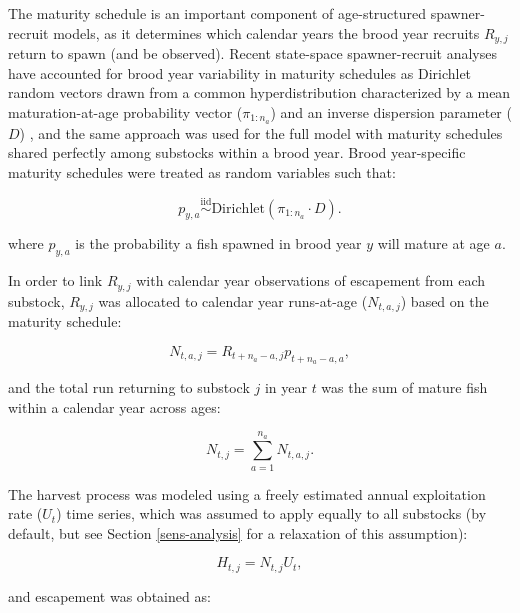 \documentclass[12pt,]{book}
\theoremstyle{definition}
\theoremstyle{definition}
\theoremstyle{definition}
\theoremstyle{remark}
\begin{document}
The maturity schedule is an important component of age-structured
spawner-recruit models, as it determines which calendar years the brood
year recruits \(R_{y,j}\) return to spawn (and be observed). Recent
state-space spawner-recruit analyses have accounted for brood year
variability in maturity schedules as Dirichlet random vectors drawn from
a common hyperdistribution characterized by a mean maturation-at-age
probability vector (\(\pi_{1:n_a}\)) and an inverse dispersion parameter
(\(D\)) \citep[see][ for implementation in
JAGS]{fleischman-etal-2013, staton-etal-2017-intseq}, and the same
approach was used for the full model with maturity schedules shared
perfectly among substocks within a brood year. Brood year-specific
maturity schedules were treated as random variables such that:

\begin{equation}
  p_{y,a} \stackrel{\text{iid}}{\sim} \text{Dirichlet}(\pi_{1:n_a} \cdot D). 
  \label{eq:dirichlet}
\end{equation}

\noindent
where \(p_{y,a}\) is the probability a fish spawned in brood year \(y\)
will mature at age \(a\).

In order to link \(R_{y,j}\) with calendar year observations of
escapement from each substock, \(R_{y,j}\) was allocated to calendar
year runs-at-age (\(N_{t,a,j}\)) based on the maturity schedule:

\begin{equation}
  N_{t,a,j} = R_{t+n_a-a,j} p_{t+n_a-a,a},
  \label{eq:tsm-get-N-ta}
\end{equation}

\noindent
and the total run returning to substock \(j\) in year \(t\) was the sum
of mature fish within a calendar year across ages:

\begin{equation}
  N_{t,j}=\sum_{a=1}^{n_a} N_{t,a,j}.
  \label{eq:tsm-get-N}
\end{equation}

\noindent
The harvest process was modeled using a freely estimated annual
exploitation rate (\(U_t\)) time series, which was assumed to apply
equally to all substocks (by default, but see Section
\ref{sens-analysis} for a relaxation of this assumption):

\begin{equation}
  H_{t,j}=N_{t,j} U_t,
  \label{eq:tsm-get-H}
\end{equation}

\noindent
and escapement was obtained as:
\end{document}
